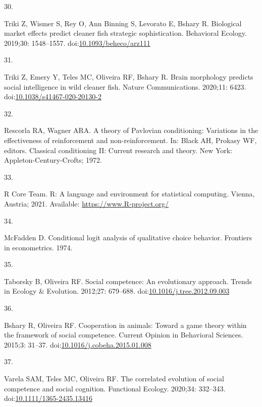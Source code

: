\documentclass[10pt,letterpaper]{article}
\newlength{\cslhangindent}
\newlength{\csllabelwidth}
\newlength{\cslentryspacingunit} %
\newenvironment{CSLReferences}[2] %
 {%
  \setlength{\parindent}{0pt}
  \ifodd #1
  \let\oldpar\par
  \def\par{\hangindent=\cslhangindent\oldpar}
  \fi
  \setlength{\parskip}{#2\cslentryspacingunit}
 }%
 {}
\newcommand{\CSLLeftMargin}[1]{\parbox[t]{\csllabelwidth}{#1}}
\newcommand{\CSLRightInline}[1]{\parbox[t]{\linewidth - \csllabelwidth}{#1}\break}
\begin{document}
\begin{CSLReferences}{0}{0}
\leavevmode{}%
\CSLLeftMargin{30. }
\CSLRightInline{Triki Z, Wismer S, Rey O, Ann Binning S, Levorato E,
Bshary R. Biological market effects predict cleaner fish strategic
sophistication. Behavioral Ecology. 2019;30: 1548--1557.
doi:\href{https://doi.org/10.1093/beheco/arz111}{10.1093/beheco/arz111}}

\leavevmode{}%
\CSLLeftMargin{31. }
\CSLRightInline{Triki Z, Emery Y, Teles MC, Oliveira RF, Bshary R. Brain
morphology predicts social intelligence in wild cleaner fish. Nature
Communications. 2020;11: 6423.
doi:\href{https://doi.org/10.1038/s41467-020-20130-2}{10.1038/s41467-020-20130-2}}

\leavevmode{}%
\CSLLeftMargin{32. }
\CSLRightInline{Rescorla RA, Wagner ARA. A theory of {Pavlovian}
conditioning: Variations in the effectiveness of reinforcement and
non-reinforcement. In: Black AH, Prokasy WF, editors. Classical
conditioning {II}: Current research and theory. New York:
Appleton-Century-Crofts; 1972. }

\leavevmode{}%
\CSLLeftMargin{33. }
\CSLRightInline{R Core Team. R: {A} language and environment for
statistical computing. Vienna, Austria; 2021. Available:
\url{https://www.R-project.org/}}

\leavevmode{}%
\CSLLeftMargin{34. }
\CSLRightInline{McFadden D. Conditional logit analysis of qualitative
choice behavior. Frontiers in econometrics. 1974. }

\leavevmode{}%
\CSLLeftMargin{35. }
\CSLRightInline{Taborsky B, Oliveira RF. Social competence: An
evolutionary approach. Trends in Ecology \& Evolution. 2012;27:
679--688.
doi:\href{https://doi.org/10.1016/j.tree.2012.09.003}{10.1016/j.tree.2012.09.003}}

\leavevmode{}%
\CSLLeftMargin{36. }
\CSLRightInline{Bshary R, Oliveira RF. Cooperation in animals: Toward a
game theory within the framework of social competence. Current Opinion
in Behavioral Sciences. 2015;3: 31--37.
doi:\href{https://doi.org/10.1016/j.cobeha.2015.01.008}{10.1016/j.cobeha.2015.01.008}}

\leavevmode{}%
\CSLLeftMargin{37. }
\CSLRightInline{Varela SAM, Teles MC, Oliveira RF. The correlated
evolution of social competence and social cognition. Functional Ecology.
2020;34: 332--343.
doi:\href{https://doi.org/10.1111/1365-2435.13416}{10.1111/1365-2435.13416}}


\end{CSLReferences}
\end{document}

